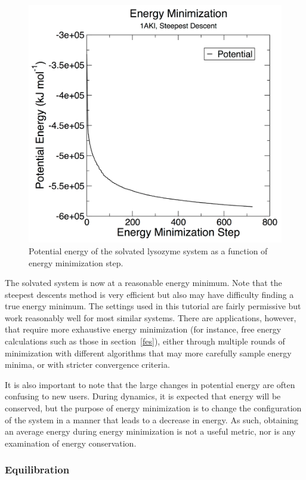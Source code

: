 \documentclass[9pt,tutorial]{livecoms}
\begin{document}
\begin{figure}[h]
\centering
\includegraphics{plot_lyso_em_potential}
\caption{Potential energy of the solvated lysozyme system as a function of energy minimization step.}
\label{lyso_em_fig}
\end{figure}

The solvated system is now at a reasonable energy minimum. Note that the steepest descents method is very efficient but also may have difficulty finding a true energy minimum. The settings used in this tutorial are fairly permissive but work reasonably well for most similar systems. There are applications, however, that require more exhaustive energy minimization (for instance, free energy calculations such as those in section~\ref{fes}), either through multiple rounds of minimization with different algorithms that may more carefully sample energy minima, or with stricter convergence criteria.

It is also important to note that the large changes in potential energy are often confusing to new users. During dynamics, it is expected that energy will be conserved, but the purpose of energy minimization is to change the configuration of the system in a manner that leads to a decrease in energy. As such, obtaining an average energy during energy minimization is not a useful metric, nor is any examination of energy conservation.

\subsubsection{Equilibration} \label{lyso_equil}
\end{document}

